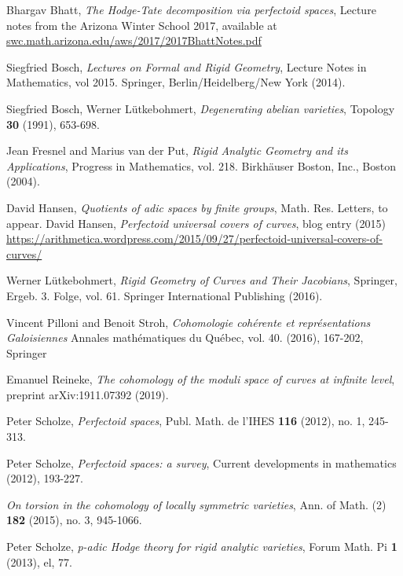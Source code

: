 \documentclass[10pt,oneside]{amsart}
\theoremstyle{definition}
\begin{document}
 
\begin{thebibliography}{99}
	Bhargav Bhatt,
	\textit{The Hodge-Tate decomposition via perfectoid spaces}, Lecture notes from the Arizona Winter School 2017, available at \url{swc.math.arizona.edu/aws/2017/2017BhattNotes.pdf}
		
	Siegfried Bosch,
	\textit{Lectures on Formal and Rigid Geometry}, Lecture Notes in Mathematics, vol 2015. Springer, Berlin/Heidelberg/New York (2014).
	
	Siegfried Bosch, Werner L\"utkebohmert,
	\textit{Degenerating abelian varieties}, Topology {\bf 30} (1991), 653-698.
	
	Jean Fresnel and Marius van der Put,
	\textit{Rigid Analytic Geometry and its Applications}, Progress in Mathematics, vol. 218. Birkh\"auser Boston, Inc., Boston (2004).
	
	David Hansen,
	\textit{Quotients of adic spaces by finite groups}, Math. Res. Letters, to appear.
	David Hansen, \textit{Perfectoid universal covers of curves}, blog entry (2015)
	\url{https://arithmetica.wordpress.com/2015/09/27/perfectoid-universal-covers-of-curves/}
	
	Werner L\"utkebohmert,
	\textit{Rigid Geometry of Curves and Their Jacobians}, Springer, Ergeb. 3. Folge, vol. 61. Springer International Publishing (2016). 
	
	Vincent Pilloni and  Benoit Stroh,
	\textit{Cohomologie coh{\'e}rente et repr{\'e}sentations Galoisiennes} 
	Annales math{\'e}matiques du Qu{\'e}bec,
		vol. 40. (2016), 167-202, Springer
	
	Emanuel Reineke,
	\textit{The cohomology of the moduli space of curves at infinite level}, preprint arXiv:1911.07392 (2019).
	
	
	Peter Scholze,
	\textit{Perfectoid spaces}, Publ. Math. de l'IHES {\bf 116} (2012), no. 1, 245-313.
	
	Peter Scholze,
	\textit{Perfectoid spaces: a survey},
	Current developments in mathematics (2012), 193-227.
	
	\textit{On torsion in the cohomology of locally symmetric varieties}, Ann. of Math. (2) {\bf 182} (2015), no. 3, 945-1066.
	
	
	Peter Scholze,
	\textit{p-adic Hodge theory for rigid analytic varieties}, Forum Math. Pi {\bf 1} (2013), el, 77.
	

\end{thebibliography}
\end{document}
